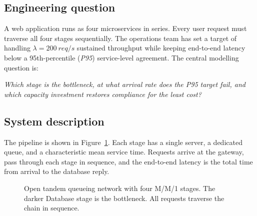 \documentclass[12pt,a4paper]{article}
\begin{document}
\subsection{Engineering question}

A web application runs as four microservices in series. Every user request must traverse
all four stages sequentially. The operations team has set a target of handling
$\lambda = \SI{200}{req/s}$ sustained throughput while keeping end-to-end latency below a
95th-percentile (\textit{P95}) service-level agreement. The central modelling question is:

\begin{center}
  \textit{Which stage is the bottleneck, at what arrival rate does the P95 target fail,
          and which capacity investment restores compliance for the least cost?}
\end{center}

\subsection{System description}

The pipeline is shown in Figure~\ref{fig:arch}. Each stage has a single server, a
dedicated queue, and a characteristic mean service time. Requests arrive at the gateway,
pass through each stage in sequence, and the end-to-end latency is the total time from
arrival to the database reply.

\begin{figure}[H]
\centering
{}
\caption{Open tandem queueing network with four M/M/1 stages. The darker Database
         stage is the bottleneck. All requests traverse the chain in sequence.}
\label{fig:arch}
\end{figure}
\end{document}
